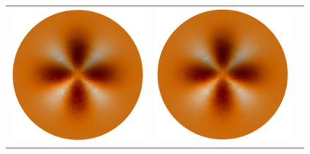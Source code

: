 \begin{figure}[H]
	\begin{center}
		\begin{tabular}[c]{c c c}
			\includegraphics[scale=.15]{recoveredPressure.png} &
			\includegraphics[scale=.15]{truePressure.png} &

\end{tabular}
\end{center}
\end{figure}
